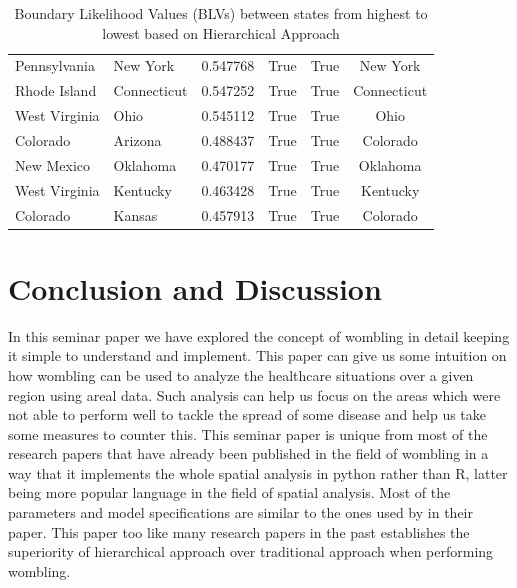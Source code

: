 \documentclass[enabledeprecatedfontcommands,parskip=half,twoside=semi,BCOR=0mm]{scrreprt}
\numberwithin{equation}{chapter}
\theoremstyle{definition}
\theoremstyle{remark}
\begin{document}
\begin{table}[h!]
\begin{adjustbox}{max width=\textwidth}
\begin{tabular}{|l|l|c|c|c|c|}
        Pennsylvania & New York & 0.547768 & True & True & New York \\
        Rhode Island & Connecticut & 0.547252 & True & True & Connecticut \\
        West Virginia & Ohio & 0.545112 & True & True & Ohio \\
        Colorado & Arizona & 0.488437 & True & True & Colorado \\
        New Mexico & Oklahoma & 0.470177 & True & True & Oklahoma \\
        West Virginia & Kentucky & 0.463428 & True & True & Kentucky \\
        Colorado & Kansas & 0.457913 & True & True & Colorado \\
        \hline
    \end{tabular}
    \end{adjustbox}
    \caption{Boundary Likelihood Values (BLVs) between states from highest to lowest based on Hierarchical Approach}
    \label{tab:boundary_diff}
    \end{table}

    \chapter{Conclusion and Discussion}
    In this seminar paper we have explored the concept of wombling in detail keeping it simple to understand and implement. This paper can give us some intuition on how wombling can be used to analyze the healthcare situations over a given region using areal data. Such analysis can help us focus on the areas which were not able to perform well to tackle the spread of some disease and help us take some measures to counter this. This seminar paper is unique from most of the research papers that have already been published in the field of wombling in a way that it implements the whole spatial analysis in python rather than R, latter being more popular language in the field of spatial analysis. Most of the parameters and model specifications are similar to the ones used by \cite{Lu_Carlin.2005} in their paper. This paper too like many research papers in the past establishes the superiority of hierarchical approach over traditional approach when performing wombling.
    
\end{document}
